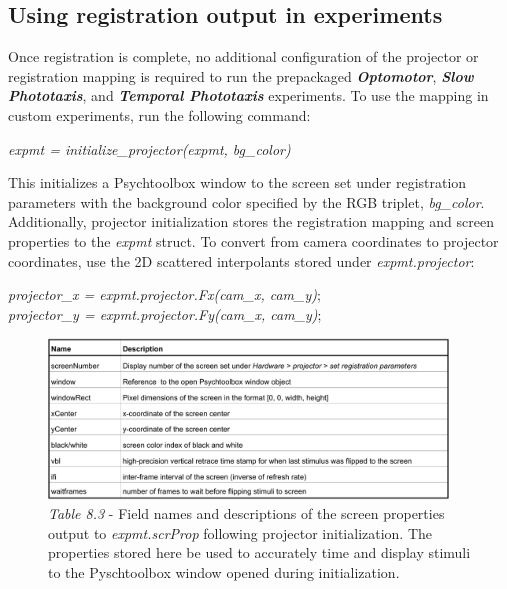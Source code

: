 \documentclass[11pt]{article}
\begin{document}
\subsection{Using registration output in experiments}

Once registration is complete, no additional configuration of the projector or registration mapping is required to run the prepackaged \textit{\textbf{Optomotor}}, \textbf{\textit{Slow Phototaxis}}, and \textbf{\textit{Temporal Phototaxis}} experiments. To use the mapping in custom experiments, run the following command: 

\begin{center}
	\textit{expmt = initialize\_projector(expmt, bg\_color)}
\end{center}

This initializes a Psychtoolbox window to the screen set under registration parameters with the background color specified by the RGB triplet, \textit{bg\_color}. Additionally, projector initialization stores the registration mapping and screen properties to the \textit{expmt} struct. To convert from camera coordinates to projector coordinates, use the 2D scattered interpolants stored under \textit{expmt.projector}:

\begin{center}
	\textit{projector\_x = expmt.projector.Fx(cam\_x, cam\_y)};\\
	\textit{projector\_y = expmt.projector.Fy(cam\_x, cam\_y)};
\end{center}

\begin{figure}[h!]
	\begin{center}
		\includegraphics[width=0.95\textwidth]{images/projector/scrProps.pdf}
		\caption*{\footnotesize {\textit{Table 8.3} - Field names and descriptions of the screen properties output to \textit{expmt.scrProp} following projector initialization. The properties stored here be used to accurately time and display stimuli to the Pyschtoolbox window opened during initialization.}}
	\end{center}
\end{figure}
\end{document}

